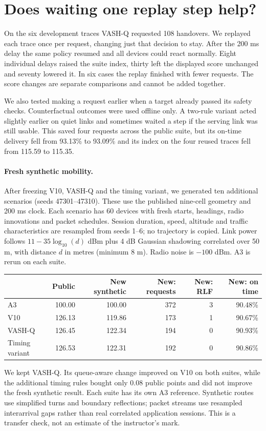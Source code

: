 \documentclass[11pt,a4paper]{article}
\begin{document}
\section{Does waiting one replay step help?}
On the six development traces VASH-Q requested 108 handovers. We replayed each trace once per request, changing just that decision to stay. After the 200 ms delay the same policy resumed and all devices could react normally. Eight individual delays raised the suite index, thirty left the displayed score unchanged and seventy lowered it. In six cases the replay finished with fewer requests. The score changes are separate comparisons and cannot be added together.
\par We also tested making a request earlier when a target already passed its safety checks. Counterfactual outcomes were used offline only. A two-rule variant acted slightly earlier on quiet links and sometimes waited a step if the serving link was still usable. This saved four requests across the public suite, but its on-time delivery fell from 93.13\% to 93.09\% and its index on the four reused traces fell from 115.59 to 115.35.
\paragraph{Fresh synthetic mobility.}
After freezing V10, VASH-Q and the timing variant, we generated ten additional scenarios (seeds 47301--47310). These use the published nine-cell geometry and 200 ms clock. Each scenario has 60 devices with fresh starts, headings, radio innovations and packet schedules. Session duration, speed, altitude and traffic characteristics are resampled from seeds 1--6; no trajectory is copied. Link power follows $11-35\log_{10}(d)$ dBm plus 4 dB Gaussian shadowing correlated over 50 m, with distance $d$ in metres (minimum 8 m). Radio noise is $-100$ dBm. A3 is rerun on each suite.
\begin{center}\small\begin{tabular}{lrrrrr}\toprule
&Public&New synthetic&New: requests&New: RLF&New: on time\\\midrule
A3&100.00&100.00&372&3&90.48\%\\
V10&126.13&119.86&173&1&90.67\%\\
VASH-Q&126.45&122.34&194&0&90.93\%\\
Timing variant&126.53&122.31&192&0&90.86\%\\\bottomrule
\end{tabular}\end{center}
We kept VASH-Q. Its queue-aware change improved on V10 on both suites, while the additional timing rules bought only 0.08 public points and did not improve the fresh synthetic result. Each suite has its own A3 reference. Synthetic routes use simplified turns and boundary reflections; packet streams use resampled interarrival gaps rather than real correlated application sessions. This is a transfer check, not an estimate of the instructor's mark.
\end{document}
